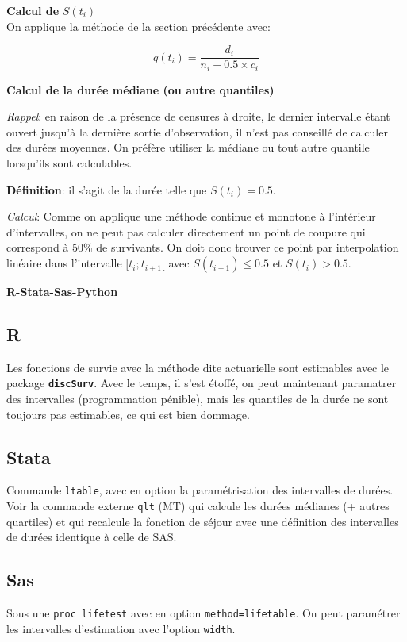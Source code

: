 \documentclass[
  12pt,
  letterpaper,
  DIV=11,
  numbers=noendperiod,
  onepage,
  openany]{scrreprt}
\begin{document}
\textbf{Calcul de} \(S(t_i)\)\\
On applique la méthode de la section précédente avec:

\[q(t_i)=\frac{d_i}{n_i - 0.5\times c_i}\]

\textbf{Calcul de la durée médiane (ou autre quantiles)}

\emph{Rappel}: en raison de la présence de censures à droite, le dernier
intervalle étant ouvert jusqu'à la dernière sortie d'observation, il
n'est pas conseillé de calculer des durées moyennes. On préfère utiliser
la médiane ou tout autre quantile lorsqu'ils sont calculables.

\textbf{Définition}: il s'agit de la durée telle que \(S(t_i)=0.5\).

\emph{Calcul}: Comme on applique une méthode continue et monotone à
l'intérieur d'intervalles, on ne peut pas calculer directement un point
de coupure qui correspond à 50\% de survivants. On doit donc trouver ce
point par interpolation linéaire dans l'intervalle \([t_i;t_{i+1}[\)
avec \(S(t_{i+1})\leq0.5\) et \(S(t_{i})>0.5\).

\textbf{R-Stata-Sas-Python}

\subsection{R}

Les fonctions de survie avec la méthode dite actuarielle sont estimables
avec le package \textbf{\texttt{discSurv}}. Avec le temps, il s'est
étoffé, on peut maintenant paramatrer des intervalles (programmation
pénible), mais les quantiles de la durée ne sont toujours pas
estimables, ce qui est bien dommage.

\subsection{Stata}

Commande \texttt{ltable}, avec en option la paramétrisation des
intervalles de durées. Voir la commande externe \texttt{qlt} (MT) qui
calcule les durées médianes (+ autres quartiles) et qui recalcule la
fonction de séjour avec une définition des intervalles de durées
identique à celle de SAS.

\subsection{Sas}

Sous une \texttt{proc\ lifetest} avec en option
\texttt{method=lifetable}. On peut paramétrer les intervalles
d'estimation avec l'option \texttt{width}.
\end{document}
